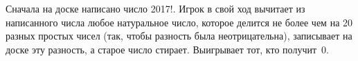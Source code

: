\documentclass[11pt,a4paper]{article}
\begin{document}
Сначала на доске написано число 2017!.
Игрок в свой ход вычитает
из написанного  числа любое натуральное число,  которое
делится не более  чем  на 20 разных простых чисел (так,  чтобы
разность была неотрицательна), записывает  на  доске эту разность,
а старое число стирает. Выигрывает тот, кто получит~0.

\vspace*{-2mm}
%
\end{document}
